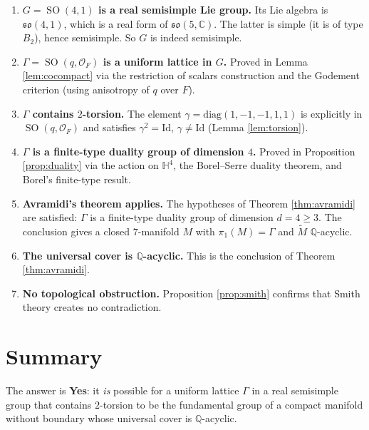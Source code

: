 \documentclass[12pt]{article}
\theoremstyle{definition}
\DeclareMathOperator{\SO}{SO}
\begin{document}
\begin{enumerate}
  \item \textbf{$G = \SO(4,1)$ is a real semisimple Lie group.}  Its Lie algebra is
    $\mathfrak{so}(4,1)$, which is a real form of $\mathfrak{so}(5,\mathbb{C})$.  The latter
    is simple (it is of type $B_2$), hence semisimple.  So $G$ is indeed semisimple.

  \item \textbf{$\Gamma = \SO(q,\mathcal{O}_F)$ is a uniform lattice in $G$.}
    Proved in Lemma \ref{lem:cocompact} via the restriction of scalars construction and
    the Godement criterion (using anisotropy of $q$ over $F$).

  \item \textbf{$\Gamma$ contains $2$-torsion.}  The element
    $\gamma = \mathrm{diag}(1,-1,-1,1,1)$ is explicitly in $\SO(q,\mathcal{O}_F)$ and
    satisfies $\gamma^2 = \mathrm{Id}$, $\gamma \neq \mathrm{Id}$ (Lemma \ref{lem:torsion}).

  \item \textbf{$\Gamma$ is a finite-type duality group of dimension $4$.}
    Proved in Proposition \ref{prop:duality} via the action on $\mathbb{H}^4$, the
    Borel--Serre duality theorem, and Borel's finite-type result.

  \item \textbf{Avramidi's theorem applies.}  The hypotheses of Theorem \ref{thm:avramidi}
    are satisfied: $\Gamma$ is a finite-type duality group of dimension $d = 4 \geq 3$.
    The conclusion gives a closed $7$-manifold $M$ with $\pi_1(M) = \Gamma$ and
    $\widetilde{M}$ $\mathbb{Q}$-acyclic.

  \item \textbf{The universal cover is $\mathbb{Q}$-acyclic.}  This is the conclusion of
    Theorem \ref{thm:avramidi}.

  \item \textbf{No topological obstruction.}  Proposition \ref{prop:smith} confirms that
    Smith theory creates no contradiction.
\end{enumerate}

\section{Summary}

The answer is \textbf{Yes}: it \emph{is} possible for a uniform lattice $\Gamma$ in a
real semisimple group that contains $2$-torsion to be the fundamental group of a compact
manifold without boundary whose universal cover is $\mathbb{Q}$-acyclic.
\end{document}
